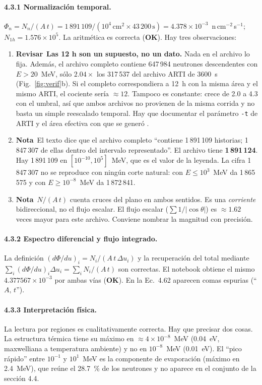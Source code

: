 \documentclass[11pt,a4paper]{article}
\newcommand{\ok}{\textcolor{green!50!black}{\textbf{OK}}}
\newcommand{\alerta}{\textcolor{rojoAviso}{\textbf{Revisar}}}
\newcommand{\nota}{\textcolor{orange!80!black}{\textbf{Nota}}}
\newcommand{\archivo}[1]{\texttt{\detokenize{#1}}}
\begin{document}
\paragraph{4.3.1 Normalización temporal.}
$\Phi_n = N_n/(A\,t) = 1\,891\,109/(10^4\,\text{cm}^2 \times 43\,200\,\text{s}) =
4.378\times10^{-3}$~n\,cm$^{-2}$\,s$^{-1}$; $N_{1h}=1.576\times10^{5}$. La aritmética es
correcta (\ok). Hay tres observaciones:
\begin{enumerate}[leftmargin=*,itemsep=2pt]
\item \alerta\ \textbf{Las 12 h son un supuesto, no un dato.} Nada en el archivo lo fija.
  Además, el archivo completo contiene 647\,984 neutrones descendentes con $E>20$~MeV, sólo
  $2.04\times$ los 317\,537 del archivo ARTI de 3600~s (Fig.~\ref{fig:verif}b). Si el completo
  correspondiera a 12~h con la misma área y el mismo ARTI, el cociente sería $\approx12$.
  Tampoco es constante: crece de 2.0 a 4.3 con el umbral, así que ambos archivos no provienen
  de la misma corrida y no basta un simple reescalado temporal. Hay que documentar el parámetro
  \texttt{-t} de ARTI y el área efectiva con que se generó \archivo{all_bga_neutron_35}.
\item \nota\ El texto dice que el archivo completo ``contiene 1\,891\,109 historias; 1\,847\,307
  de ellas dentro del intervalo representado''. El archivo tiene \textbf{1\,891\,124}. Hay
  1\,891\,109 en $[10^{-10},10^{5}]$~MeV, que es el valor de la leyenda. La cifra 1\,847\,307
  no se reproduce con ningún corte natural: con $E\le10^{3}$~MeV da 1\,865\,575 y con
  $E\ge10^{-8}$~MeV da 1\,872\,841.
\item \nota\ $N/(A\,t)$ cuenta cruces del plano en ambos sentidos. Es una \emph{corriente}
  bidireccional, no el flujo escalar. El flujo escalar ($\sum 1/|\cos\theta|$) es
  $\approx1.62$ veces mayor para este archivo. Conviene nombrar la magnitud con precisión.
\end{enumerate}

\paragraph{4.3.2 Espectro diferencial y flujo integrado.}
La definición $(d\Phi/du)_i=N_i/(A\,t\,\Delta u_i)$ y la recuperación del total mediante
$\sum_i(d\Phi/du)_i\Delta u_i=\sum_i N_i/(A\,t)$ son correctas. El notebook obtiene el mismo
$4.377567\times10^{-3}$ por ambas vías (\ok). En la Ec.~4.62 aparecen comas espurias
(``$A,\,t$'').

\paragraph{4.3.3 Interpretación física.}
La lectura por regiones es cualitativamente correcta. Hay que precisar dos cosas. La
estructura térmica tiene su máximo en $\approx4\times10^{-8}$~MeV (0.04~eV, maxwelliana a
temperatura ambiente) y no en $10^{-8}$~MeV (0.01~eV). El ``pico rápido'' entre $10^{-1}$ y
$10^{1}$~MeV es la componente de evaporación (máximo en 2.4~MeV), que reúne el 28.7~\% de los
neutrones y no aparece en el conjunto de la sección 4.4.
\end{document}
